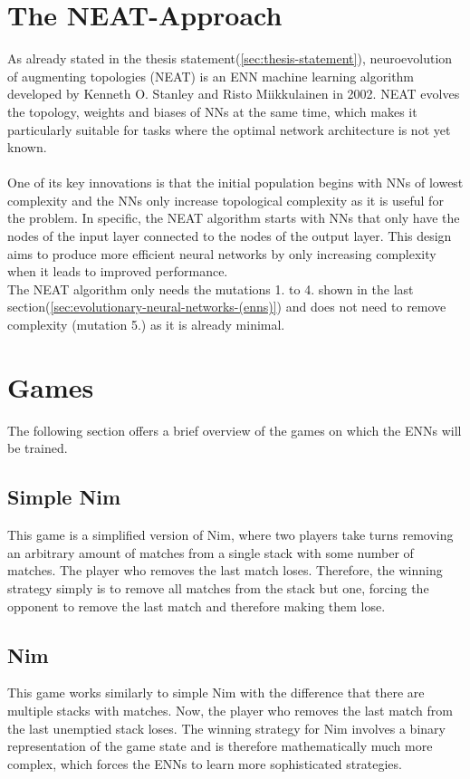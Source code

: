 \section{The NEAT-Approach}\label{sec:the-neat-approach}
As already stated in the thesis statement(\ref{sec:thesis-statement}), neuroevolution of augmenting topologies (NEAT) is an ENN machine learning algorithm developed by Kenneth O. Stanley and Risto Miikkulainen in 2002\cite[p.105-106]{Neat_02}.
NEAT evolves the topology, weights and biases of NNs at the same time, which makes it particularly suitable for tasks where the optimal network architecture is not yet known.
\\ \\
One of its key innovations is that the initial population begins with NNs of lowest complexity and the NNs only increase topological complexity as it is useful for the problem.
In specific, the NEAT algorithm starts with NNs that only have the nodes of the input layer connected to the nodes of the output layer.
This design aims to produce more efficient neural networks by only increasing complexity when it leads to improved performance.
\\
The NEAT algorithm only needs the mutations 1. to 4. shown in the last section(\ref{sec:evolutionary-neural-networks-(enns)}) and does not need to remove complexity (mutation 5.) as it is already minimal.


\section{Games}\label{sec:games}
The following section offers a brief overview of the games on which the ENNs will be trained.

\subsection{Simple Nim}\label{subsec:simple-nim}
This game is a simplified version of Nim, where two players take turns removing an arbitrary amount of matches from a single stack with some number of matches.
The player who removes the last match loses.
Therefore, the winning strategy simply is to remove all matches from the stack but one, forcing the opponent to remove the last match and therefore making them lose.

\subsection{Nim}\label{subsec:nim}
This game works similarly to simple Nim with the difference that there are multiple stacks with matches.
Now, the player who removes the last match from the last unemptied stack loses.
The winning strategy for Nim involves a binary representation of the game state\cite{rosenbloom2003} and is therefore mathematically much more complex, which forces the ENNs to learn more sophisticated strategies.



